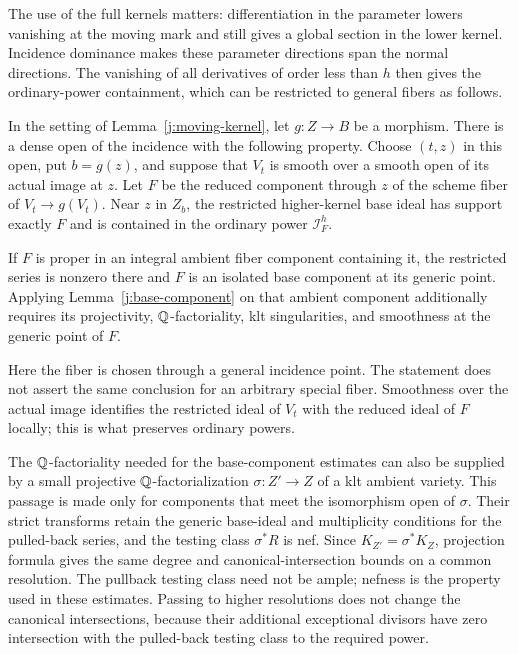The use of the full kernels matters: differentiation in the
parameter lowers vanishing at the moving mark and still gives a
global section in the lower kernel.  Incidence dominance makes
these parameter directions span the normal directions.  The
vanishing of all derivatives of order less than $h$ then gives
the ordinary-power containment, which can be restricted to
general fibers as follows.

\begin{lemma}
\label{j:fiber-restriction}
In the setting of Lemma~\ref{j:moving-kernel}, let $g:Z\to B$ be
a morphism.  There is a dense open of the incidence with the
following property.  Choose $(t,z)$ in this open, put $b=g(z)$,
and suppose that $V_t$ is smooth over a smooth open of its actual
image at $z$.  Let $F$ be the reduced component through $z$ of
the scheme fiber of $V_t\to g(V_t)$.  Near $z$ in $Z_b$, the
restricted higher-kernel base ideal has support exactly $F$ and
is contained in the ordinary power $\mathcal I_F^h$.

If $F$ is proper in an integral ambient fiber component containing
it, the restricted series is nonzero there and $F$ is an isolated
base component at its generic point.  Applying
Lemma~\ref{j:base-component} on that ambient component additionally
requires its projectivity, $\mathbb Q$-factoriality, klt singularities,
and smoothness at the generic point of $F$.
\end{lemma}

Here the fiber is chosen through a general incidence point.  The
statement does not assert the same conclusion for an arbitrary
special fiber.  Smoothness over the actual image identifies the
restricted ideal of $V_t$ with the reduced ideal of $F$ locally;
this is what preserves ordinary powers.

The $\mathbb Q$-factoriality needed for the base-component estimates can
also be supplied by a small projective $\mathbb Q$-factorialization
$\sigma:Z'\to Z$ of a klt ambient variety.  This passage is made
only for components that meet the isomorphism open of $\sigma$.
Their strict transforms retain the generic base-ideal and
multiplicity conditions for the pulled-back series, and the
testing class $\sigma^*R$ is nef.  Since
$K_{Z'}=\sigma^*K_Z$, projection formula gives the same degree
and canonical-intersection bounds on a common resolution.
The pullback testing class need not be ample; nefness is the
property used in these estimates.  Passing to higher resolutions
does not change the canonical intersections, because their
additional exceptional divisors have zero intersection with
the pulled-back testing class to the required power.

